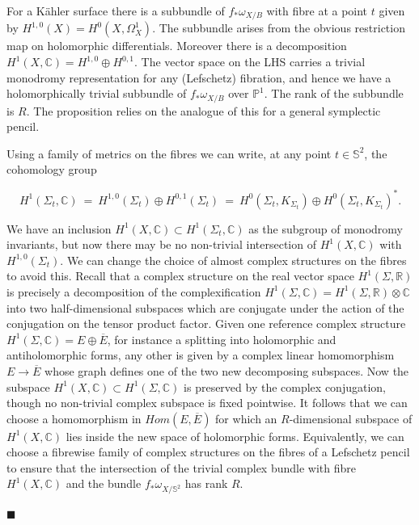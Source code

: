 \documentclass[10pt]{article}
\newcommand{\pp}{\mathbb{P}}
\newcommand{\cc}{\mathbb{C}}
\newcommand{\rr}{\mathbb{R}}
\newcommand{\sss}{\mathbb{S}}
\newenvironment{Pf}{\par \noindent{\sc Proof:} }{\quad $\blacksquare$ \par
\vspace{0.5cm}}
\begin{document}
\begin{Pf}
For a K\"ahler surface there is a  subbundle of $f_* \omega_{X/B}$ with fibre
at a point $t$ given by $H^{1,0}(X) = H^0 (X, \Omega^1_X)$.  The
subbundle arises from the obvious restriction map on holomorphic
differentials. 
Moreover there is a decomposition $H^1 (X, \cc) = H^{1,0} \oplus
H^{0,1}$.  The vector space on the LHS carries a trivial monodromy
representation for any (Lefschetz) fibration, and hence we have a 
holomorphically trivial subbundle of $f_* \omega_{X/B}$ over
$\pp^1$.  The rank of the subbundle is $R$.  The proposition relies on
the analogue of this for a general symplectic pencil.

\vspace{0.2cm}

\noindent Using a family of metrics on the fibres
we can write, at any point $t \in \sss^2$, the cohomology group

$$H^1 (\Sigma_t, \cc) \ = \ H^{1,0} (\Sigma_t) \oplus H^{0,1}
(\Sigma_t) \ = \ H^0 (\Sigma_t, K_{\Sigma_t}) \oplus H^0 (\Sigma_t,
K_{\Sigma_t})^*.$$

\noindent We have an inclusion $H^1 (X, \cc) \subset H^1
(\Sigma_t, \cc)$ as the subgroup of monodromy invariants, but now
there may be no non-trivial intersection of $H^1 (X, \cc)$ with
$H^{1,0}(\Sigma_t)$.  We can change the choice of almost complex
structures on the fibres to avoid this.  Recall that a complex
structure on the real vector space $H^1 (\Sigma, \rr)$ is precisely a
decomposition of the complexification $H^1 (\Sigma, \cc) = H^1
(\Sigma, \rr) \otimes \cc$ into two half-dimensional subspaces which
are conjugate under the action of the conjugation on the tensor
product factor.  Given one reference complex structure $H^1 (\Sigma,
\cc) = E \oplus \overline{E}$, for instance a splitting into
holomorphic and antiholomorphic forms, any other is
given by a complex linear homomorphism $E \rightarrow \overline{E}$
whose graph defines one of the two new decomposing subspaces.  Now the
subspace $H^1 (X, \cc) \subset H^1 (\Sigma, \cc)$ is preserved by the
complex conjugation, though no non-trivial complex subspace is fixed
pointwise.  It follows that we can choose a homomorphism in $Hom (E,
\overline{E})$ for which an $R$-dimensional subspace of $H^1 (X, \cc)$
lies inside the new space of holomorphic forms.  Equivalently, we can
choose a fibrewise family of complex structures on the fibres of a
Lefschetz pencil to ensure that the intersection of the trivial
complex bundle with fibre $H^1 (X, \cc)$ and the bundle $f_* \omega_{X
  / \sss^2}$ has rank $R$.


\end{Pf}
\end{document}

